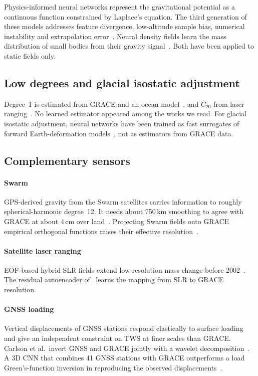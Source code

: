 Physics-informed neural networks represent the gravitational potential as a continuous function constrained by Laplace's equation. The third generation of these models addresses feature divergence, low-altitude sample bias, numerical instability and extrapolation error~\cite{martin2024pinngm3}. Neural density fields learn the mass distribution of small bodies from their gravity signal~\cite{izzo2022geodesynets}. Both have been applied to static fields only.

\subsection{Low degrees and glacial isostatic adjustment}

Degree~1 is estimated from GRACE and an ocean model~\cite{swenson2008geocenter}, and $C_{20}$ from laser ranging~\cite{loomis2019oblateness}. No learned estimator appeared among the works we read. For glacial isostatic adjustment, neural networks have been trained as fast surrogates of forward Earth-deformation models~\cite{love2024gia_surrogate}, not as estimators from GRACE data.

\subsection{Complementary sensors}

\paragraph{Swarm} GPS-derived gravity from the Swarm satellites carries information to roughly spherical-harmonic degree~12. It needs about 750\,km smoothing to agree with GRACE at about 4\,cm over land~\cite{teixeira2020swarm_gfm,luck2018swarm_ocean}. Projecting Swarm fields onto GRACE empirical orthogonal functions raises their effective resolution~\cite{richter2021swarm_reconstruction}.

\paragraph{Satellite laser ranging} EOF-based hybrid SLR fields extend low-resolution mass change before 2002~\cite{locher2021slr_hybrid}. The residual autoencoder of~\cite{uz2024highres} learns the mapping from SLR to GRACE resolution.

\paragraph{GNSS loading} Vertical displacements of GNSS stations respond elastically to surface loading and give an independent constraint on TWS at finer scales than GRACE. Carlson et al.\ invert GNSS and GRACE jointly with a wavelet decomposition~\cite{carlson2022gnss_grace}. A 3D CNN that combines 41 GNSS stations with GRACE outperforms a load Green's-function inversion in reproducing the observed displacements~\cite{wei2025cnn_gnss_loading}.

